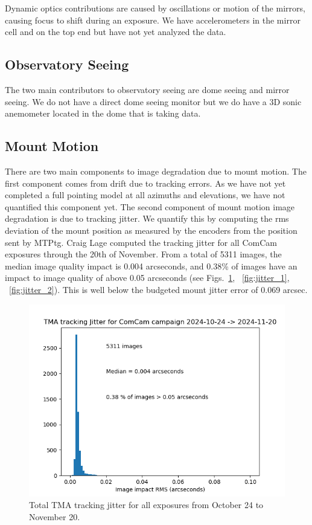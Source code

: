 Dynamic optics contributions are caused by oscillations or motion of the mirrors, causing focus to shift during an exposure. We have accelerometers in the mirror cell and on the top end but have not yet analyzed the data.

\subsection{Observatory Seeing}

The two main contributors to observatory seeing are dome seeing and mirror seeing. We do not have a direct dome seeing monitor but we do have a 3D sonic anemometer located in the dome that is taking data.

\subsection{Mount Motion}

There are two main components to image degradation due to mount motion. The first component comes from drift due to tracking errors. As we have not yet completed a full pointing model at all azimuths and elevations, we have not quantified this component yet. The second component of mount motion image degradation is due to tracking jitter. We quantify this by computing the rms deviation of the mount position as measured by the encoders from the position sent by MTPtg. Craig Lage computed the tracking jitter for all ComCam exposures through the 20th of November. From a total of 5311 images, the median image quality impact is 0.004 arcseconds, and 0.38\% of images have an impact to image quality of above 0.05 arcseconds (see Figs.~\ref{fig:jitter}, ~\ref{fig:jitter_1}, ~\ref{fig:jitter_2}). This is well below the budgeted mount jitter error of 0.069 arcsec.

\begin{figure}
  \includegraphics[width=\linewidth]{image_quality_figures/ComCam_Mount_Jitter_21Nov24.png}
  \caption{Total TMA tracking jitter for all exposures from October 24 to November 20.}
  \label{fig:jitter}
\end{figure}

